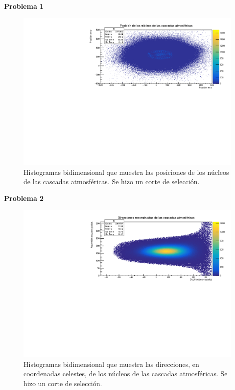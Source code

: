 \documentclass[11pt]{article}
\begin{document}
\textbf{Problema 1}
\begin{figure}[H]
\centering
\includegraphics[width=1 \textwidth]{../Figuras/Prob1}
\caption{Histogramas bidimensional que muestra las posiciones de los núcleos de las cascadas atmosféricas. Se hizo un corte de selección.}
\label{fig:Prob1}
\end{figure}
\textbf{Problema 2}
\begin{figure}[H]
\centering
\includegraphics[width=1 \textwidth]{../Figuras/Prob2}
\caption{Histogramas bidimensional que muestra las direcciones, en coordenadas celestes, de los núcleos de las cascadas atmosféricas. Se hizo un corte de selección.}
\label{fig:Prob2}
\end{figure}

\pagebreak
\end{document}
